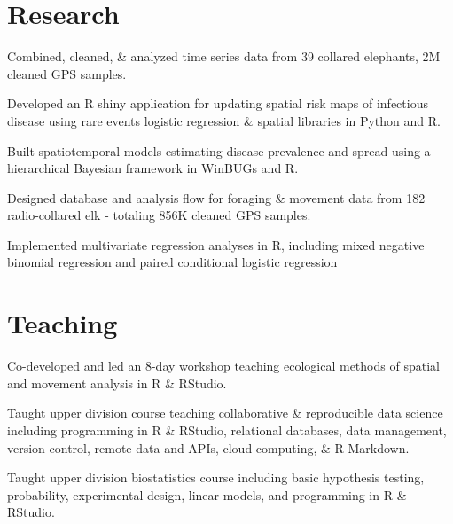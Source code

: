 \documentclass[]{deedy-resume-openfont}
\begin{document}
\begin{minipage}[t]{0.66\textwidth}
\section{Research}
\begin{tightemize}
\item Combined, cleaned, \& analyzed time series data from 39 collared elephants, 2M cleaned GPS samples.
\item Developed an R shiny application for updating spatial risk maps of infectious disease using rare events logistic regression \& spatial libraries in Python and R.
\item Built spatiotemporal models estimating disease prevalence and spread using a hierarchical Bayesian framework in WinBUGs and R.\\
\end{tightemize}
\begin{tightemize}
\item Designed database and analysis flow for foraging \& movement data from 182 radio-collared elk - totaling 856K cleaned GPS samples.
\item Implemented multivariate regression analyses in R, including mixed negative binomial regression and paired conditional logistic regression 
\end{tightemize}
\sectionsep


\section{Teaching}
 
 Co-developed and led an 8-day workshop teaching ecological methods of spatial and movement analysis in R \& RStudio. \href{https://danaseidel.com/MovEco-R-Workshop/}{\faGlobe} \href{https://github.com/dpseidel/MovEco-R-Workshop/}{\faGithub} 
\vspace{4pt}

 
 Taught upper division course teaching collaborative \& reproducible data science including programming in R \& RStudio, relational databases, data management, version control, remote data and APIs, cloud computing, \& R Markdown. \href{https://espm-288.carlboettiger.info/}{\faGlobe} \href{https://github.com/ds421}{\faGithub}
\vspace{4pt}

	 
Taught upper division biostatistics course including basic hypothesis testing, probability, experimental design, linear models, and programming in R \& RStudio.
\end{minipage} 
\end{document}
